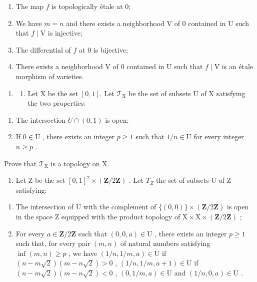 \begin{enumerate}
\def\labelenumi{(\roman{enumi})}
\item
  The map \(f\) is topologically étale at 0;
\item
  We have \(m = n\) and there exists a neighborhood V of 0 contained in U such that \(f \mid \mathrm{V}\) is injective;
\item
  The differential of \(f\) at 0 is bijective;
\item
  There exists a neighborhood V of 0 contained in U such that \(f \mid \mathrm{V}\) is an étale morphism of varieties.
\end{enumerate}

\begin{enumerate}
\def\labelenumi{\arabic{enumi})}
\setcounter{enumi}{6}
\tightlist
\item
  \begin{enumerate}
  \def\labelenumii{\alph{enumii})}
  \tightlist
  \item
    Let X be the set \([0,1]\). Let \(\mathcal{T}_{\mathrm{X}}\) be the set of subsets U of X satisfying the two properties:
  \end{enumerate}
\end{enumerate}

\begin{enumerate}
\def\labelenumi{(\roman{enumi})}
\item
  The intersection \(U\cap(0,1)\) is open;
\item
  If \(0 \in \mathrm{U}\) , there exists an integer \(p \geqslant 1\) such that \(1/n \in \mathrm{U}\) for every integer \(n \geqslant p\) .
\end{enumerate}

Prove that \(\mathcal{T}_{\mathrm{X}}\) is a topology on X.

\begin{enumerate}
\def\labelenumi{\alph{enumi})}
\setcounter{enumi}{1}
\tightlist
\item
  Let Z be the set \([0,1]^{2} \times (\mathbf{Z}/2\mathbf{Z})\) . Let \(T_{Z}\) the set of subsets U of Z satisfying:
\end{enumerate}

\begin{enumerate}
\def\labelenumi{(\roman{enumi})}
\item
  The intersection of U with the complement of \(\{(0,0)\} \times (\mathbf{Z}/2\mathbf{Z})\) is open in the space Z equipped with the product topology of \(\mathrm{X} \times \mathrm{X} \times (\mathbf{Z}/2\mathbf{Z})\) ;
\item
  For every \(a \in \mathbf{Z}/2\mathbf{Z}\) such that \((0,0,a) \in \mathrm{U}\) , there exists an integer \(p \geqslant 1\) such that, for every pair \((m,n)\) of natural numbers satisfying \(\inf(m,n) \geqslant p\) , we have \((1/n,1/m,a) \in \mathrm{U}\) if \((n-m\sqrt{2})(m-n\sqrt{2}) > 0\) , \((1/n,1/m,a+1) \in \mathrm{U}\) if \((n-m\sqrt{2})(m-n\sqrt{2}) < 0\) , \((0,1/m,a) \in \mathrm{U}\) and \((1/n,0,a) \in \mathrm{U}\) .
\end{enumerate}

